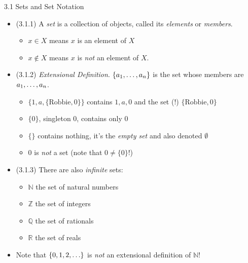 \begin{frame}{3.1 Sets and Set Notation}

	\begin{itemize}
	
		\item (3.1.1) A \emph{set} is a collection of objects, called its \emph{elements} or \emph{members}.
		
		\begin{itemize}
		
			\item $x\in X$ means $x$ is an element of $X$
			
			\item $x\notin X$ means $x$ is \emph{not} an element of $X$.
		
		\end{itemize}
		
		\item (3.1.2) \emph{Extensional Definition}. $\{a_1, \mathellipsis, a_n\}$ is the set whose members are $a_1, \mathellipsis, a_n$.
		
		\begin{itemize}
		
			\item  $\{1,a, \{\text{Robbie},0\}\}$ contains $1,a,0$ and the set (!) $ \{\text{Robbie},0\}$
			
			\item $\{0\}$, singleton 0, contains only $0$			
			\item $\{ \}$ contains nothing, it's the \emph{empty set} and also denoted $\emptyset$
			
			\item $0$ is \emph{not} a set (note that $0\neq \{0\}$!)
		
		\end{itemize}

		\item (3.1.3) There are also \emph{infinite} sets:		
		
			\begin{itemize}
			
				\item $\mathbb{N}$ the set of natural numbers
				
				\item $\mathbb{Z}$ the set of integers
				
				\item $\mathbb{Q}$ the set of rationals
				
				\item $\mathbb{R}$ the set of reals
			
			\end{itemize} 
			
		\item Note that  $\{0,1,2,\mathellipsis\}$ is \emph{not} an extensional definition of $\mathbb{N}$! 
		
	\end{itemize}

\end{frame}

